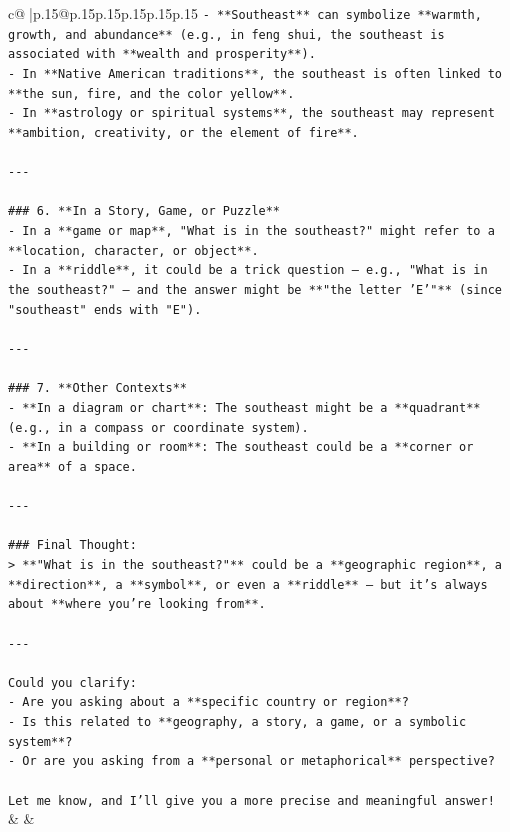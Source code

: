 \documentclass{article}
\begin{document}
{\begin{supertabular}{c@{$\;$}|p{.15\linewidth}@{}p{.15\linewidth}p{.15\linewidth}p{.15\linewidth}p{.15\linewidth}p{.15\linewidth}}
{{{\texttt{{-} **Southeast** can symbolize **warmth, growth, and abundance** (e.g., in feng shui, the southeast is associated with **wealth and prosperity**).} \\
\texttt{{-} In **Native American traditions**, the southeast is often linked to **the sun, fire, and the color yellow**.} \\
\texttt{{-} In **astrology or spiritual systems**, the southeast may represent **ambition, creativity, or the element of fire**.} \\
\\ 
\texttt{{-}{-}{-}} \\
\\ 
\texttt{\#\#\# 6. **In a Story, Game, or Puzzle**} \\
\texttt{{-} In a **game or map**, "What is in the southeast?" might refer to a **location, character, or object**.} \\
\texttt{{-} In a **riddle**, it could be a trick question — e.g., "What is in the southeast?" — and the answer might be **"the letter 'E'"** (since "southeast" ends with "E").} \\
\\ 
\texttt{{-}{-}{-}} \\
\\ 
\texttt{\#\#\# 7. **Other Contexts**} \\
\texttt{{-} **In a diagram or chart**: The southeast might be a **quadrant** (e.g., in a compass or coordinate system).} \\
\texttt{{-} **In a building or room**: The southeast could be a **corner or area** of a space.} \\
\\ 
\texttt{{-}{-}{-}} \\
\\ 
\texttt{\#\#\# Final Thought:} \\
\texttt{> **"What is in the southeast?"** could be a **geographic region**, a **direction**, a **symbol**, or even a **riddle** — but it’s always about **where you’re looking from**.} \\
\\ 
\texttt{{-}{-}{-}} \\
\\ 
\texttt{Could you clarify:} \\
\texttt{{-} Are you asking about a **specific country or region**?} \\
\texttt{{-} Is this related to **geography, a story, a game, or a symbolic system**?} \\
\texttt{{-} Or are you asking from a **personal or metaphorical** perspective?} \\
\\ 
\texttt{Let me know, and I’ll give you a more precise and meaningful answer!} \\
            }
        }
    }
    & & \\ \\


\end{supertabular}}
\end{document}

